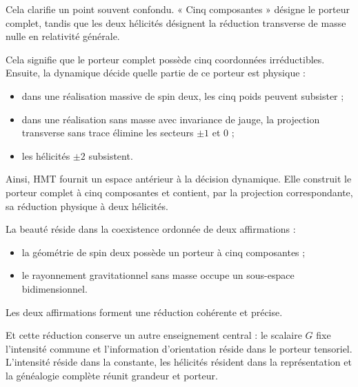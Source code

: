 Cela clarifie un point souvent confondu. « Cinq composantes » désigne le porteur complet, tandis que les deux hélicités désignent la réduction transverse de masse nulle en relativité générale.\par

Cela signifie que le porteur complet possède cinq coordonnées irréductibles. Ensuite, la dynamique décide quelle partie de ce porteur est physique :\par

\begin{itemize}[leftmargin=*,itemsep=0.35em]
\item dans une réalisation massive de spin deux, les cinq poids peuvent subsister ;
\item dans une réalisation sans masse avec invariance de jauge, la projection transverse sans trace élimine les secteurs \(\pm1\) et \(0\) ;
\item les hélicités \(\pm2\) subsistent.
\end{itemize}

Ainsi, HMT fournit un espace antérieur à la décision dynamique. Elle construit le porteur complet à cinq composantes et contient, par la projection correspondante, sa réduction physique à deux hélicités.\par

La beauté réside dans la coexistence ordonnée de deux affirmations :\par

\begin{itemize}[leftmargin=*,itemsep=0.35em]
\item la géométrie de spin deux possède un porteur à cinq composantes ;
\item le rayonnement gravitationnel sans masse occupe un sous-espace bidimensionnel.
\end{itemize}

Les deux affirmations forment une réduction cohérente et précise.\par

Et cette réduction conserve un autre enseignement central : le scalaire \(G\) fixe l’intensité commune et l’information d’orientation réside dans le porteur tensoriel. L’intensité réside dans la constante, les hélicités résident dans la représentation et la généalogie complète réunit grandeur et porteur.\par

